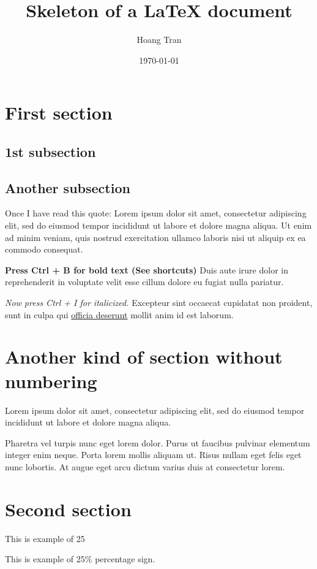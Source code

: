\documentclass{article}
\title{Skeleton of a LaTeX document}
\author{Hoang Tran}
\date{\today}
\begin{document}
\maketitle
\tableofcontents

\section{First section}
\subsection{1st subsection}
\subsection*{Another subsection}

Once I have read this quote: 
Lorem ipsum dolor sit amet, consectetur adipiscing elit, sed do eiusmod tempor incididunt ut labore et dolore magna aliqua. 
Ut enim ad minim veniam, quis nostrud exercitation ullamco laboris nisi ut aliquip ex ea commodo consequat. 

\textbf{Press Ctrl + B for bold text (See shortcuts)} Duis aute irure dolor in reprehenderit in voluptate velit esse cillum dolore eu fugiat nulla pariatur. \par \textit{Now press Ctrl + I for italicized.} Excepteur sint occaecat cupidatat non proident, sunt in culpa qui \underline{officia deserunt} mollit anim id est laborum.


\section*{Another kind of section without numbering}
Lorem ipsum dolor sit amet, consectetur adipiscing elit, sed do eiusmod tempor incididunt ut labore et dolore magna aliqua. \par
Pharetra vel turpis nunc eget lorem dolor. Purus ut faucibus pulvinar elementum integer enim neque. Porta lorem mollis aliquam ut. \newline
Risus nullam eget felis eget nunc lobortis. At augue eget arcu dictum varius duis at consectetur lorem. 
\begin{comment} %
    Laoreet suspendisse interdum consectetur libero. Accumsan in nisl nisi scelerisque eu. Tortor consequat id porta nibh venenatis cras sed felis. Pretium fusce id velit ut.
\end{comment}

\section{Second section}
This is example of 25%

This is example of 25\% percentage sign. \newline
\blindtext
\end{document}
